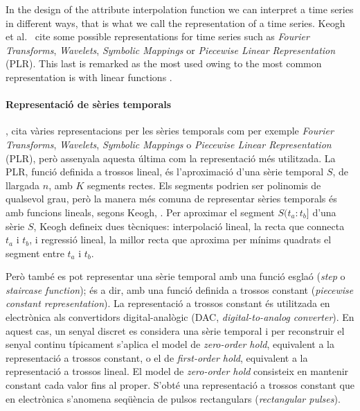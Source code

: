 \todo{}


In the design of the attribute interpolation function we can interpret
a time series in different ways, that is what we call the
representation of a time series. Keogh et al.\ \cite{last:keogh} cite
some possible representations for time series such as \emph{Fourier
  Transforms}, \emph{Wavelets}, \emph{Symbolic Mappings} or
\emph{Piecewise Linear Representation} (PLR). This last is remarked as
the most used owing to the most common representation is with linear
functions \cite{keogh01}.

\paragraph{Representació de sèries temporals}

\textcite{last:keogh}, cita vàries representacions per les sèries temporals com per exemple \emph{Fourier Transforms}, \emph{Wavelets}, \emph{Symbolic Mappings} o \emph{Piecewise Linear Representation} (PLR), però assenyala aquesta última com la representació més utilitzada. 
La PLR, funció definida a trossos lineal, és l'aproximació d'una sèrie temporal $S$, de llargada $n$, amb $K$ segments rectes. Els segments podrien ser polinomis de qualsevol grau, però la manera més comuna de representar sèries temporals és amb funcions lineals, segons Keogh, \cite{keogh02}.
Per aproximar el segment $S(t_a:t_b]$ d'una sèrie $S$, Keogh defineix dues tècniques: interpolació lineal, la recta que connecta $t_a$ i $t_b$, i regressió lineal, la millor recta que aproxima per mínims quadrats el segment entre $t_a$ i $t_b$.

Però també es pot representar una sèrie temporal amb una funció esglaó (\emph{step} o \emph{staircase function}); és a dir, amb una funció definida a trossos constant (\emph{piecewise constant representation}).
La representació a trossos constant és utilitzada en electrònica als convertidors digital-analògic (DAC, \emph{digital-to-analog converter}). En aquest cas, un senyal discret es considera una sèrie temporal i per reconstruir el senyal continu típicament s'aplica el model de \emph{zero-order hold}, equivalent a la representació a trossos constant,  o el de \emph{first-order hold},  equivalent a la representació a trossos lineal.
El model de \emph{zero-order hold} consisteix en mantenir constant cada valor fins al proper. S'obté una representació a trossos constant que en electrònica s'anomena seqüència de pulsos rectangulars (\emph{rectangular pulses}).

